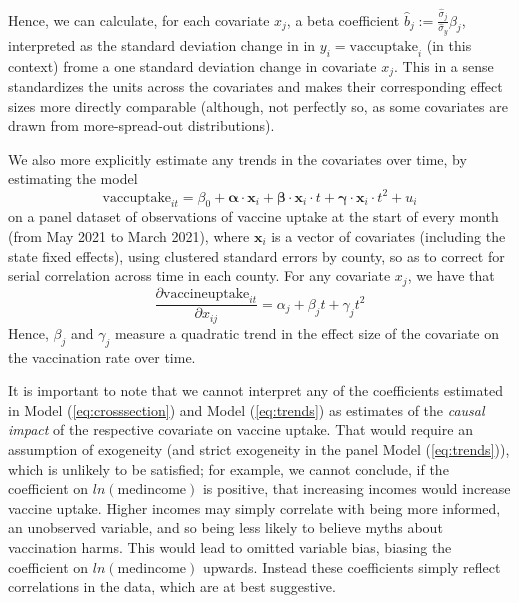\documentclass[12pt]{article}
\begin{document}
\begin{spacing}{1.5}
		Hence, we can calculate, for each covariate $x_j$, a beta coefficient $\hat{b}_j := \frac{\hat{\sigma}_j}{\hat{\sigma}_y}\beta_j$, interpreted as the standard deviation change in in $y_i=\textrm{vaccuptake}_i$ (in this context) frome a one standard deviation change in covariate $x_j$. This in a sense standardizes the units across the covariates and makes their corresponding effect sizes more directly comparable (although, not perfectly so, as some covariates are drawn from more-spread-out distributions).
		
		We also more explicitly estimate any trends in the covariates over time, by estimating the model
		\begin{equation}
			\textrm{vaccuptake}_{it} =  \beta_0 + \boldsymbol{\alpha}\cdot\mathbf{x}_{i} + \boldsymbol{\beta}\cdot\mathbf{x}_{i}\cdot t + \boldsymbol{\gamma}\cdot\mathbf{x}_{i}\cdot t^2 + u_i
		\end{equation}
		on a panel dataset of observations of vaccine uptake at the start of every month (from May 2021 to March 2021), where $\mathbf{x}_{i}$ is a vector of covariates (including the state fixed effects), using clustered standard errors by county, so as to correct for serial correlation across time in each county. For any covariate $x_j$, we have that
		\begin{equation} \label{eq:trends}
			\frac{\partial \textrm{vaccineuptake}_{it}}{\partial x_{ij}} = \alpha_j + \beta_jt + \gamma_jt^2
		\end{equation}
		Hence, $\beta_j$ and $\gamma_j$ measure a quadratic trend in the effect size of the covariate on the vaccination rate over time.
		
		
		It is important to note that we cannot interpret any of the coefficients estimated in Model (\ref{eq:crosssection}) and Model (\ref{eq:trends})  as estimates of the \textit{causal impact} of the respective covariate on vaccine uptake. That would require an assumption of exogeneity (and strict exogeneity in the panel Model (\ref{eq:trends})), which is unlikely to be satisfied; for example, we cannot conclude, if the coefficient on $ln(\textrm{medincome})$ is positive, that increasing incomes would increase vaccine uptake. Higher incomes may simply correlate with being more informed, an unobserved variable, and so being less likely to believe myths about vaccination harms. This would lead to omitted variable bias, biasing the coefficient on $ln(\textrm{medincome})$ upwards. Instead these coefficients simply reflect correlations in the data, which are at best suggestive.
		

\end{spacing}
\end{document}
